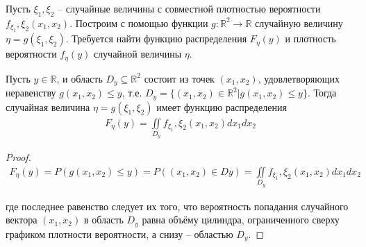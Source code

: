 \begin{zam}
Пусть $\xi_1 , \xi_2$ -- случайные величины с совместной плотностью вероятности $f_{\xi_1} ,\xi_2 (x_1 , x_2 )$. Построим с помощью функции $g : \mathbb{R}^2 \to \mathbb{R}$ случайную величину $\eta = g(\xi_1 , \xi_2 )$. Требуется найти функцию распределения $F_\eta (y)$ и плотность вероятности $f_\eta (y)$ случайной величины $\eta$.
\end{zam}

\begin{lemma}
Пусть $y \in \mathbb{R}$, и область $D_y \subseteq \mathbb{R}^2$ состоит из точек $(x_1 , x_2 )$, удовлетворяющих неравенству $g(x_1 , x_2 ) \leq y$, т.е. $D_y = \{(x_1 , x_2 ) \in \mathbb{R}^2 | g(x_1 , x_2 ) \leq y\}$. Тогда случайная величина $\eta = g(\xi_1 , \xi_2 )$ имеет функцию распределения
\begin{gather*}
	F_\eta (y) = \iint\limits_{D_y}f_{\xi_1} ,\xi_2 (x_1 , x_2 ) dx_1 dx_2
\end{gather*}
\end{lemma}

\begin{proof}
\begin{gather*}
	F_\eta (y) = P ( g(x_1 , x_2 ) \leq y ) = P( (x_1 , x_2 ) \in Dy )= \iint\limits_{D_y}f_{\xi_1} ,\xi_2 (x_1 , x_2 ) dx_1 dx_2
\end{gather*}

где последнее равенство следует их того, что вероятность попадания случайного вектора $(x_1 , x_2 )$ в область $D_y$ равна объёму цилиндра, ограниченного сверху графиком плотности вероятности, а снизу -- областью $D_y$.
\end{proof}


